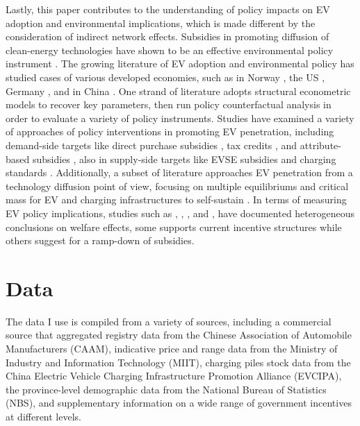 \documentclass[12pt]{article}
\begin{document}
Lastly, this paper contributes to the understanding of policy impacts on EV adoption and environmental implications, which is made different by the consideration of indirect network effects. 
Subsidies in promoting diffusion of clean-energy technologies have shown to be an effective environmental policy instrument \citep{acemoglu_environment_2012}.
The growing literature of EV adoption and environmental policy has studied cases of various developed economies, 
such as in Norway \citep{springel_network_2021, van_dijk_technology_2022, koch_when_2022}, the US \citep{holland_are_2016, li_market_2017, li_compatibility_2023,xing_what_2021}, Germany \citep{heid_equilibrium_2024, remmy_adjustable_2024}, and in China \citep{guo_welfare_2023, barwick_attribute-based_2024, zhu_diffusion_2024}.
One strand of literature adopts structural econometric models to recover key parameters, then run policy counterfactual analysis in order to evaluate a variety of policy instruments.
Studies have examined a variety of approaches of policy interventions in promoting EV penetration, including demand-side targets like direct purchase subsidies \citep{guo_welfare_2023} 
, tax credits \citep{xing_what_2021}, and attribute-based subsidies \citep{barwick_attribute-based_2024}, also in supply-side targets like EVSE subsidies \citep{li_market_2017, springel_network_2021, zhu_diffusion_2024} and charging standards \citep{li_compatibility_2023}.
Additionally, a subset of literature approaches EV penetration from a technology diffusion point of view, focusing on multiple equilibriums and critical mass for EV and charging infrastructures to self-sustain \citep{zhou_technology_2018, koch_when_2022, van_dijk_technology_2022}.
In terms of measuring EV policy implications, studies such as \citet{holland_are_2016}, \citet{guo_welfare_2023}, \citet{heid_equilibrium_2024}, and \citet{barwick_attribute-based_2024},
have documented heterogeneous conclusions on welfare effects, some supports current incentive structures while others suggest for a ramp-down of subsidies. 


\section{Data}
\hspace*{\parindent}The data I use is compiled from a variety of sources, including a commercial source that aggregated registry data from the Chinese Association of Automobile Manufacturers (CAAM), 
indicative price and range data from the Ministry of Industry and Information Technology (MIIT), 
charging piles stock data from the China Electric Vehicle Charging Infrastructure Promotion Alliance (EVCIPA), 
the province-level demographic data from the National Bureau of Statistics (NBS), and supplementary information on a wide range of government incentives at different levels.
\end{document}
